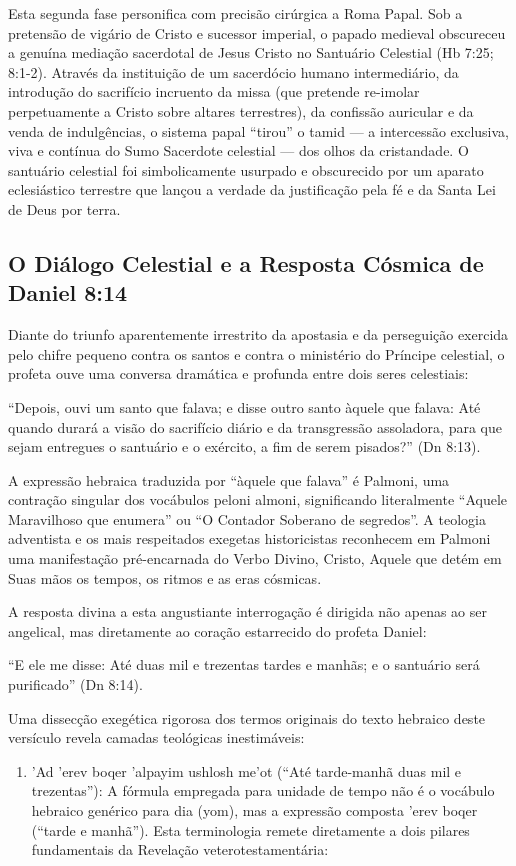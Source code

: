 Esta segunda fase personifica com precisão cirúrgica a Roma Papal. Sob a pretensão de vigário de Cristo e sucessor imperial, o papado medieval obscureceu a genuína mediação sacerdotal de Jesus Cristo no Santuário Celestial (Hb 7:25; 8:1-2). Através da instituição de um sacerdócio humano intermediário, da introdução do sacrifício incruento da missa (que pretende re-imolar perpetuamente a Cristo sobre altares terrestres), da confissão auricular e da venda de indulgências, o sistema papal ``tirou'' o tamid — a intercessão exclusiva, viva e contínua do Sumo Sacerdote celestial — dos olhos da cristandade. O santuário celestial foi simbolicamente usurpado e obscurecido por um aparato eclesiástico terrestre que lançou a verdade da justificação pela fé e da Santa Lei de Deus por terra.



\subsection{O Diálogo Celestial e a Resposta Cósmica de Daniel 8:14}


Diante do triunfo aparentemente irrestrito da apostasia e da perseguição exercida pelo chifre pequeno contra os santos e contra o ministério do Príncipe celestial, o profeta ouve uma conversa dramática e profunda entre dois seres celestiais:

``Depois, ouvi um santo que falava; e disse outro santo àquele que falava: Até quando durará a visão do sacrifício diário e da transgressão assoladora, para que sejam entregues o santuário e o exército, a fim de serem pisados?'' (Dn 8:13).

A expressão hebraica traduzida por ``àquele que falava'' é Palmoni, uma contração singular dos vocábulos peloni almoni, significando literalmente ``Aquele Maravilhoso que enumera'' ou ``O Contador Soberano de segredos''. A teologia adventista e os mais respeitados exegetas historicistas reconhecem em Palmoni uma manifestação pré-encarnada do Verbo Divino, Cristo, Aquele que detém em Suas mãos os tempos, os ritmos e as eras cósmicas.

A resposta divina a esta angustiante interrogação é dirigida não apenas ao ser angelical, mas diretamente ao coração estarrecido do profeta Daniel:

``E ele me disse: Até duas mil e trezentas tardes e manhãs; e o santuário será purificado'' (Dn 8:14).

Uma dissecção exegética rigorosa dos termos originais do texto hebraico deste versículo revela camadas teológicas inestimáveis:
\begin{enumerate}
  \item 'Ad 'erev boqer 'alpayim ushlosh me'ot (``Até tarde-manhã duas mil e trezentas''): A fórmula empregada para unidade de tempo não é o vocábulo hebraico genérico para dia (yom), mas a expressão composta 'erev boqer (``tarde e manhã''). Esta terminologia remete diretamente a dois pilares fundamentais da Revelação veterotestamentária:
\end{enumerate}

